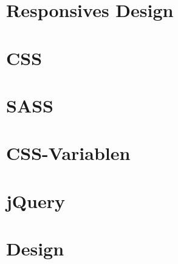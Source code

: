 \documentclass[
    headings=optiontotocandhead,%
    twoside,
    numbers=noenddot,%
    toc=flat, %
    12pt, %
    titlepage, %
    parskip=full, %
    listof=totoc, %
    listof=flat, %
    numbers=noenddot, %
    bibliography=totoc, %
    a4paper,DIV=14,
    BCOR=15mm,
]{scrbook}
\begin{document}
    

\section{Responsives Design}\label{Responsives Design}

\renewcommand{\kapitelautor}{Autor: Dominik Nußbaumer}

    

\section{CSS}\label{CSS}

\renewcommand{\kapitelautor}{Autor: Dominik Nußbaumer}

    

    

    

    

\section{SASS}\label{SASS}

\renewcommand{\kapitelautor}{Autor: Dominik Nußbaumer}

    

\section{CSS-Variablen}\label{CSS-Variablen}

\renewcommand{\kapitelautor}{Autor: Dominik Nußbaumer}

    

\section{jQuery}\label{jQuery}

\renewcommand{\kapitelautor}{Autor: Dominik Nußbaumer}

    

\section{Design}\label{Design}
\end{document}
